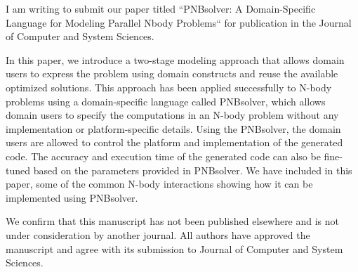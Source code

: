 \documentclass[11pt,stdletter,dateleft,orderfromtodate]{newlfm}
\begin{document}
\begin{newlfm}

 I am writing to submit our paper titled ``PNBsolver: A Domain-Specific Language for Modeling Parallel 
 Nbody Problems`` for publication in the Journal of Computer and System Sciences.

 In this paper, we introduce a two-stage modeling approach that allows domain users to express the
 problem using domain constructs and reuse the available optimized solutions. This approach has been
 applied successfully to N-body problems using a domain-specific language called PNBsolver, which
 allows domain users to specify the computations in an N-body problem without any implementation or
 platform-specific details. Using the PNBsolver, the domain users are allowed to control the platform and
 implementation of the generated code. The accuracy and execution time of the generated code can also
 be fine-tuned based on the parameters provided in PNBsolver. We have included in this paper, some of
 the common N-body interactions showing how it can be implemented using PNBsolver.

 We confirm that this manuscript has not been published elsewhere and is not under consideration by
 another journal. All authors have approved the manuscript and agree with its submission to Journal of
 Computer and System Sciences.
\end{newlfm}
\end{document}
